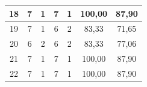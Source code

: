 \begin{table}[H]
\begin{tabular}{|ccccc|c|c|}
		\multicolumn{1}{|c|}{18}                                & \multicolumn{1}{c|}{7}                                                                          & \multicolumn{1}{c|}{1}                                                                          & \multicolumn{1}{c|}{7}                                                                          & 1                                                  & 100,00                                               & 87,90                                                     \\ \hline
		\multicolumn{1}{|c|}{19}                                & \multicolumn{1}{c|}{7}                                                                          & \multicolumn{1}{c|}{1}                                                                          & \multicolumn{1}{c|}{6}                                                                          & 2                                                  & 83,33                                                & 71,65                                                     \\ \hline
		\multicolumn{1}{|c|}{20}                                & \multicolumn{1}{c|}{6}                                                                          & \multicolumn{1}{c|}{2}                                                                          & \multicolumn{1}{c|}{6}                                                                          & 2                                                  & 83,33                                                & 77,06                                                     \\ \hline
		\multicolumn{1}{|c|}{21}                                & \multicolumn{1}{c|}{7}                                                                          & \multicolumn{1}{c|}{1}                                                                          & \multicolumn{1}{c|}{7}                                                                          & 1                                                  & 100,00                                               & 87,90                                                     \\ \hline
		\multicolumn{1}{|c|}{22}                                & \multicolumn{1}{c|}{7}                                                                          & \multicolumn{1}{c|}{1}                                                                          & \multicolumn{1}{c|}{7}                                                                          & 1                                                  & 100,00                                               & 87,90                                                     \\ \hline

\end{tabular}
\end{table}
